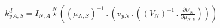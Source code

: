 \documentclass[border=2pt]{standalone}
\begin{document}
${{k^d_y}}{_{A, S}}={{I}}{_{N, A}} \stackrel{N}{\star} \left(\left( {{\mu}}{_{N, S}} \right)^{-1} \, . \, \left({{v_y}}{_{N}} \, . \, \left(\left( {V}{_{N}} \right)^{-1} \, . \, \frac{\partial{{U}{_{N}}}}{\partial{{{\mu}}{_{N, S}}}}\right)\right)\right)$
\end{document}
